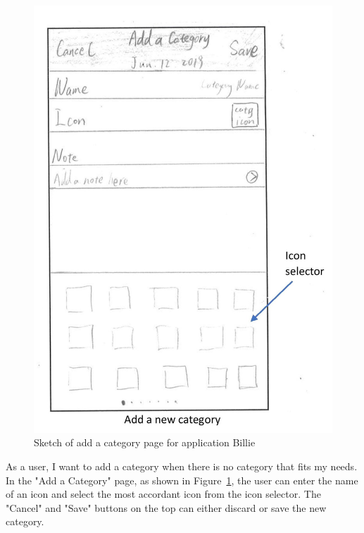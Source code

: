 \documentclass{sigchi}
\begin{document}
\begin{figure}[h!]
\centering
  \includegraphics[width=0.6\columnwidth]{18-add-category-page.jpg}
  \caption{Sketch of add a category page for application Billie}
  \label{fig:figure33}
\end{figure}
As a user, I want to add a category when there is no category that fits my needs. In the "Add a Category" page, as shown in Figure~\ref{fig:figure33}, the user can enter the name of an icon and select the most accordant icon from the icon selector. The "Cancel" and "Save" buttons on the top can either discard or save the new category.
\end{document}

